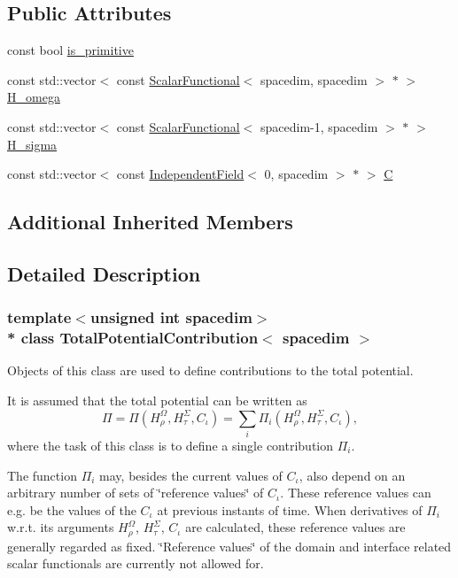 \subsection*{Public Attributes}
\begin{DoxyCompactItemize}
\item 
const bool \hyperlink{class_total_potential_contribution_a45bfb25a7693c949c26e223cf4a1a1e7}{is\+\_\+primitive}
\item 
const std\+::vector$<$ const \hyperlink{class_scalar_functional}{Scalar\+Functional}$<$ spacedim, spacedim $>$ $\ast$ $>$ \hyperlink{class_total_potential_contribution_a15191539345978a3d0c7293bd7ecaa91}{H\+\_\+omega}
\item 
const std\+::vector$<$ const \hyperlink{class_scalar_functional}{Scalar\+Functional}$<$ spacedim-\/1, spacedim $>$ $\ast$ $>$ \hyperlink{class_total_potential_contribution_aac404e3a8493d9170541e34bd96673d3}{H\+\_\+sigma}
\item 
const std\+::vector$<$ const \hyperlink{class_independent_field}{Independent\+Field}$<$ 0, spacedim $>$ $\ast$ $>$ \hyperlink{class_total_potential_contribution_adea8f8f88243adec43df300e8c8d4593}{C}
\end{DoxyCompactItemize}
\subsection*{Additional Inherited Members}


\subsection{Detailed Description}
\subsubsection*{template$<$unsigned int spacedim$>$\\*
class Total\+Potential\+Contribution$<$ spacedim $>$}

Objects of this class are used to define contributions to the total potential.

It is assumed that the total potential can be written as \begin{equation*} \Pi = \Pi(H^\Omega_\rho, H^\Sigma_\tau, C_\iota) = \sum_i \Pi_i(H^\Omega_\rho, H^\Sigma_\tau, C_\iota), \end{equation*} where the task of this class is to define a single contribution $\Pi_i$.

The function $\Pi_i$ may, besides the current values of $C_\iota$, also depend on an arbitrary number of sets of \char`\"{}reference values\char`\"{} of $C_\iota$. These reference values can e.\+g. be the values of the $C_\iota$ at previous instants of time. When derivatives of $\Pi_i$ w.\+r.\+t. its arguments $H^\Omega_\rho$, $H^\Sigma_\tau$, $C_\iota$ are calculated, these reference values are generally regarded as fixed. \char`\"{}\+Reference values\char`\"{} of the domain and interface related scalar functionals are currently not allowed for.

